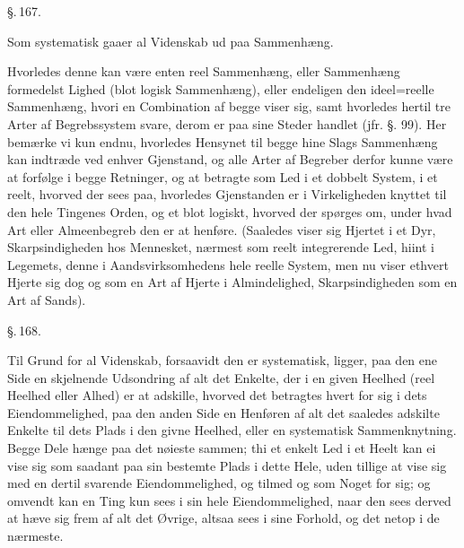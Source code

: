 \documentclass[12pt]{book}
\makeatletter
\def\textit#1{#1}%
\def\emph#1{#1}%
\newcommand{\umph}[2][misc]{%
  \@ifundefined{umph@#1@on}{#2}{\emph{#2}}}
\newcommand{\parag}[1]{%
  \par\vspace{0.9\baselineskip}%
  {\centering\textit{\S.\,#1.}\par}%
  \vspace{0.35\baselineskip}%
  \noindent\hspace{\parindent}\ignorespaces
}
\newcommand{\opage}[1]{\marginnote{\footnotesize\textit{[#1]}}}
\makeatother
\begin{document}
\parag{167}

Som systematisk gaaer al Videnskab ud paa Sammenhæng.

Hvorledes denne kan være enten reel Sammenhæng, eller Sammenhæng formedelst
Lighed (blot logisk Sammenhæng), eller endeligen den ideel=reelle Sammenhæng,
hvori en Combination af begge viser sig, samt hvorledes hertil tre Arter af
Begrebssystem svare, derom er paa sine Steder handlet (jfr. §. 99). Her
bemærke
\opage{366} %
vi kun endnu, hvorledes Hensynet til begge hine Slags Sammenhæng kan indtræde
ved enhver Gjenstand, og alle Arter af Begreber derfor kunne være at forfølge i
begge Retninger, og at betragte som Led i et dobbelt System, i et reelt,
hvorved der sees paa, hvorledes Gjenstanden er i Virkeligheden knyttet til den
hele Tingenes Orden, og et blot logiskt, hvorved der spørges om, under hvad Art
eller Almeenbegreb den er at henføre. (Saaledes viser sig Hjertet i et Dyr,
Skarpsindigheden hos Mennesket, nærmest som reelt integrerende Led, hiint i
Legemets, denne i Aandsvirksomhedens hele reelle System, men nu viser ethvert
Hjerte sig dog og som en Art af Hjerte i Almindelighed, Skarpsindigheden som en
Art af Sands).

\parag{168}

Til Grund for al Videnskab, forsaavidt den er systematisk, ligger, paa den ene
Side en skjelnende Udsondring af alt det Enkelte, der i en given Heelhed (reel
Heelhed eller Alhed) er at adskille, hvorved det betragtes hvert for sig i dets
Eiendommelighed, paa den anden Side en Henføren af alt det saaledes adskilte
Enkelte til dets Plads i den givne Heelhed, eller en systematisk
Sammenknytning. Begge Dele hænge paa det nøieste sammen; thi et enkelt Led i et
Heelt kan ei vise sig som saadant paa sin bestemte Plads i dette Hele, uden
tillige at vise sig med en dertil svarende Eiendommelighed, og tilmed og som
Noget for sig; og omvendt kan
\opage{367} %
en Ting kun sees i sin hele Eiendommelighed, naar den sees derved at hæve sig
frem af alt det Øvrige, altsaa sees i sine Forhold, og det netop i de nærmeste.
\end{document}
